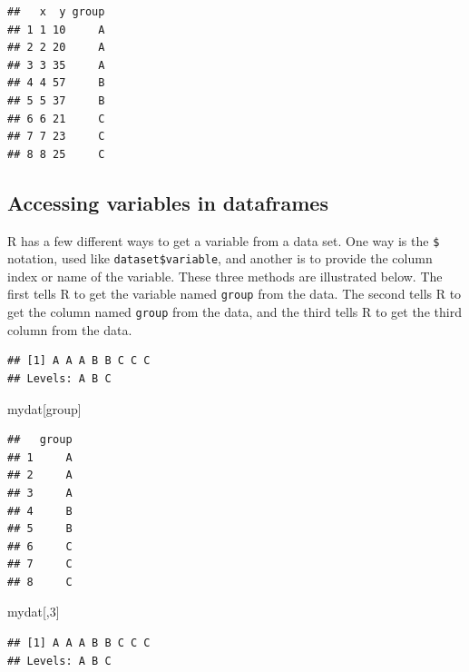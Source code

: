 \documentclass[
]{book}
\newenvironment{Shaded}{\begin{snugshade}}{\end{snugshade}}
\newcommand{\DecValTok}[1]{\textcolor[rgb]{0.00,0.00,0.81}{#1}}
\newcommand{\NormalTok}[1]{#1}
\newcommand{\SpecialCharTok}[1]{\textcolor[rgb]{0.00,0.00,0.00}{#1}}
\newcommand{\StringTok}[1]{\textcolor[rgb]{0.31,0.60,0.02}{#1}}
\begin{document}
\begin{verbatim}
##   x  y group
## 1 1 10     A
## 2 2 20     A
## 3 3 35     A
## 4 4 57     B
## 5 5 37     B
## 6 6 21     C
## 7 7 23     C
## 8 8 25     C
\end{verbatim}

\hypertarget{accessing-variables-in-dataframes}{%
\subsection{Accessing variables in dataframes}\label{accessing-variables-in-dataframes}}

R has a few different ways to get a variable from a data set. One way is
the \texttt{\$} notation, used like \texttt{dataset\$variable}, and another is to
provide the column index or name of the variable. These three methods
are illustrated below. The first tells R to get the variable named
\texttt{group} from the data. The second tells R to get the column named
\texttt{group} from the data, and the third tells R to get the third column
from the data.

\begin{Shaded}
\end{Shaded}

\begin{verbatim}
## [1] A A A B B C C C
## Levels: A B C
\end{verbatim}

\begin{Shaded}
\begin{Highlighting}[]
\NormalTok{mydat[}\StringTok{\textquotesingle{}group\textquotesingle{}}\NormalTok{] }
\end{Highlighting}
\end{Shaded}

\begin{verbatim}
##   group
## 1     A
## 2     A
## 3     A
## 4     B
## 5     B
## 6     C
## 7     C
## 8     C
\end{verbatim}

\begin{Shaded}
\begin{Highlighting}[]
\NormalTok{mydat[,}\DecValTok{3}\NormalTok{]}
\end{Highlighting}
\end{Shaded}

\begin{verbatim}
## [1] A A A B B C C C
## Levels: A B C
\end{verbatim}
\end{document}
